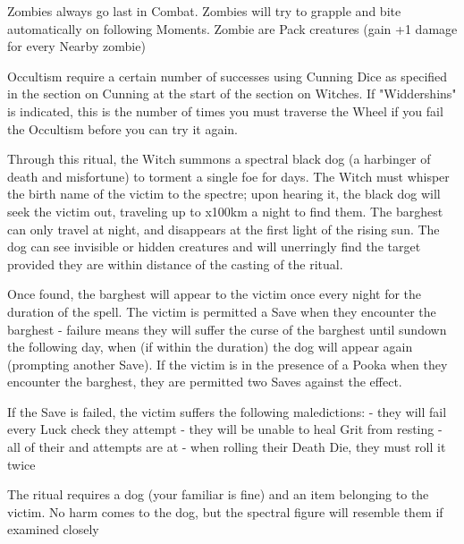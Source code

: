 {\cbreak

\MONSTERBLOCK[
  Name=Zombie,
  Link=monster-zombie,
  MV=Slow*,
  WK=d20,
  DMG=2d4 1 Close,
  HD=2,
  Power=Strong,
  Soak=0,
  Morale=n/a,
  Save=2,
  Extras={Pack}
]

Zombies always go last in Combat. Zombies will try to grapple and bite automatically on following Moments. Zombie are Pack creatures (gain +1 damage for every Nearby zombie)


\newpage


Occultism require a certain number of successes using Cunning Dice as specified in the section on Cunning at the start of the section on Witches.  If "Widdershins" is indicated, this is the number of times you must traverse the Wheel if you fail the Occultism before you can try it again.

\OCCULT[
  Name=Barghest,
  Link=occultism-barghest,
  Success=4,
  Cost=See below,
  Widdershins=1
]

Through this ritual, the Witch summons a spectral black dog (a harbinger of death and misfortune) to torment a single foe for \LVL days.  The Witch must whisper the birth name of the victim to the spectre; upon hearing it, the black dog will seek the victim out, traveling up to \LVL x100km a night to find them.  The barghest can only travel at night, and disappears at the first light of the rising sun.  The dog can see invisible or hidden creatures and will unerringly find the target provided they are within distance of the casting of the ritual.

Once found, the barghest will appear to the victim once every night for the duration of the spell.  The victim is permitted a Save when they encounter the barghest - failure means they will suffer the curse of the barghest until sundown the following day, when (if within the duration) the dog will appear again (prompting another Save).  If the victim is in the presence of a Pooka when they encounter the barghest, they are permitted two Saves against the effect.

If the Save is failed, the victim suffers the following maledictions:
- they will fail every Luck check they attempt
- they will be unable to heal Grit from resting
- all of their \RO and \RB attempts are at \DCDOWN
- when rolling their Death Die, they must roll it twice

The ritual requires a dog (your familiar is fine) and an item belonging to the victim.  No harm comes to the dog, but the spectral figure will resemble them if examined closely


}
